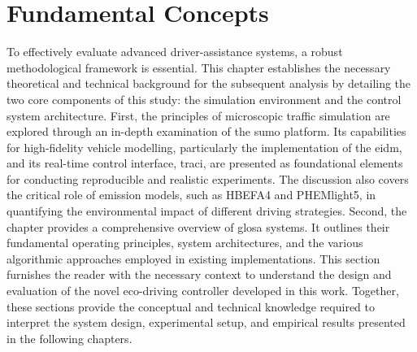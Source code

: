 \chapter{Fundamental Concepts}
\label{ch:fundamental_concepts}

To effectively evaluate advanced driver-assistance systems, a robust methodological framework is essential. This chapter establishes the necessary theoretical and technical background for the subsequent analysis by detailing the two core components of this study: the simulation environment and the control system architecture.
\mynewline
First, the principles of microscopic traffic simulation are explored through an in-depth examination of the \ac{sumo} platform. Its capabilities for high-fidelity vehicle modelling, particularly the implementation of the \ac{eidm}, and its real-time control interface, \ac{traci}, are presented as foundational elements for conducting reproducible and realistic experiments. The discussion also covers the critical role of emission models, such as HBEFA4 and PHEMlight5, in quantifying the environmental impact of different driving strategies.
\mynewline
Second, the chapter provides a comprehensive overview of \ac{glosa} systems. It outlines their fundamental operating principles, system architectures, and the various algorithmic approaches employed in existing implementations. This section furnishes the reader with the necessary context to understand the design and evaluation of the novel eco-driving controller developed in this work. Together, these sections provide the conceptual and technical knowledge required to interpret the system design, experimental setup, and empirical results presented in the following chapters.




